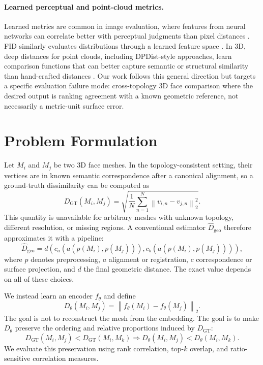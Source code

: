 \documentclass{article}
\begin{document}
\paragraph{Learned perceptual and point-cloud metrics.}
Learned metrics are common in image evaluation, where features from neural networks can correlate better with perceptual judgments than pixel distances \citep{zhang2018lpips}. FID similarly evaluates distributions through a learned feature space \citep{heusel2017fid}. In 3D, deep distances for point clouds, including DPDist-style approaches, learn comparison functions that can better capture semantic or structural similarity than hand-crafted distances \citep{dpdist2021}. Our work follows this general direction but targets a specific evaluation failure mode: cross-topology 3D face comparison where the desired output is ranking agreement with a known geometric reference, not necessarily a metric-unit surface error.

\section{Problem Formulation}

Let $M_i$ and $M_j$ be two 3D face meshes. In the topology-consistent setting, their vertices are in known semantic correspondence after a canonical alignment, so a ground-truth dissimilarity can be computed as
\begin{equation}
    D_{\mathrm{GT}}(M_i,M_j)
    =
    \sqrt{\frac{1}{N}\sum_{n=1}^{N}\left\|v_{i,n}-v_{j,n}\right\|_2^2}.
\end{equation}
This quantity is unavailable for arbitrary meshes with unknown topology, different resolution, or missing regions. A conventional estimator $\hat{D}_{\mathrm{geo}}$ therefore approximates it with a pipeline:
\begin{equation}
    \hat{D}_{\mathrm{geo}} =
    d\left(
        c_a\left(a\left(p(M_i),p(M_j)\right)\right),
        c_b\left(a\left(p(M_i),p(M_j)\right)\right)
    \right),
\end{equation}
where $p$ denotes preprocessing, $a$ alignment or registration, $c$ correspondence or surface projection, and $d$ the final geometric distance. The exact value depends on all of these choices.

We instead learn an encoder $f_\theta$ and define
\begin{equation}
    D_\theta(M_i,M_j) = \left\|f_\theta(M_i)-f_\theta(M_j)\right\|_2.
\end{equation}
The goal is not to reconstruct the mesh from the embedding. The goal is to make $D_\theta$ preserve the ordering and relative proportions induced by $D_{\mathrm{GT}}$:
\begin{equation}
    D_{\mathrm{GT}}(M_i,M_j) < D_{\mathrm{GT}}(M_i,M_k)
    \Rightarrow
    D_\theta(M_i,M_j) < D_\theta(M_i,M_k).
\end{equation}
We evaluate this preservation using rank correlation, top-$k$ overlap, and ratio-sensitive correlation measures.
\end{document}

